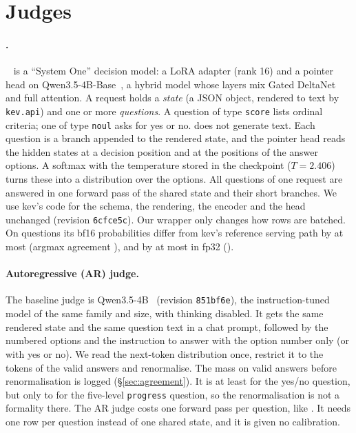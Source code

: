 
\section{Judges}\label{sec:judges}

\paragraph{\kev{}.} \kev{}~\cite{kev4b} is a ``System One'' decision model: a LoRA adapter (rank 16) and a pointer head
on Qwen3.5-4B-Base~\cite{qwen35}, a hybrid model whose layers mix Gated DeltaNet~\cite{yang2025gated} and full
attention. A request holds a \emph{state} (a JSON object, rendered to text by \texttt{kev.api}) and one or more
\emph{questions}. A question of type \texttt{score} lists ordinal criteria; one of type \texttt{noul} asks for yes or no.
\kev{} does not generate text. Each question is a branch appended to the rendered state, and the pointer head reads the
hidden states at a decision position and at the positions of the answer options. A softmax with the temperature stored
in the checkpoint ($T=2.406$) turns these into a distribution over the options. All questions of one request are
answered in one forward pass of the shared state and their short branches. We use kev's code for the schema, the
rendering, the encoder and the head unchanged (revision \texttt{6cfce5c}). Our wrapper only changes how rows are
batched. On  questions its bf16 probabilities differ from kev's reference serving path by at most
 (argmax agreement ), and by at most  in fp32
().

\paragraph{Autoregressive (AR) judge.} The baseline judge is Qwen3.5-4B~\cite{qwen35} (revision \texttt{851bf6e}), the
instruction-tuned model of the same family and size, with thinking disabled. It gets the same rendered state and the
same question text in a chat prompt, followed by the numbered options and the instruction to answer with the option
number only (or with yes or no). We read the next-token distribution once, restrict it to the tokens of the valid
answers and renormalise. The mass on valid answers before renormalisation is logged (\S\ref{sec:agreement}). It is at
least  for the yes/no question, but only  to
 for the five-level \texttt{progress} question, so the renormalisation is not a formality
there. The AR judge costs one forward pass per question, like \kev{}. It needs one row per
question instead of one shared state, and it is given no calibration.

